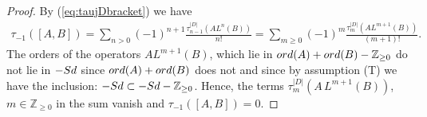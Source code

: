\documentclass[11pt]{article}
\def \Z {\mathbb Z}
\numberwithin{equation}{section}
\begin{document}
\begin{proof}
By (\ref{eq:taujDbracket}) we have
\begin{gather*}
\tau_{-1}([A,B]) = \sum_{n> 0} (-1)^{n+1}\frac{\tau_{n-1}^{\vert D\vert} \left(
    A L^n(B)\right)}{n!}
 =  \sum_{m\geq  0} (-1)^{m}\frac{\tau_{m}^{\vert D\vert} \left(
    A L^{m+1}(B)\right)}{(m+1)!}.
\end{gather*}
The orders of the  operators
  $  A  L^{m+1}(B)$, which lie  in ${\rm ord}(A)+ {\rm ord}(B)-\Z_{\geq 0}$  do not lie
  in $-{\rm Sd}$ since   ${\rm ord}(A)+ {\rm ord}(B)$ does not and since by assumption (T) we have the inclusion: $ -{\rm Sd}\subset
-{\rm Sd} -\Z_{\geq 0}$. Hence,
 the terms $\tau_{m}^{\vert D\vert} \left(
    A\,L^{m+1}(B)\right)$, $m\in \Z_{\geq 0}$ in the sum vanish and
$\tau_{-1}([A,B])=0$. \end{proof}
\end{document}
